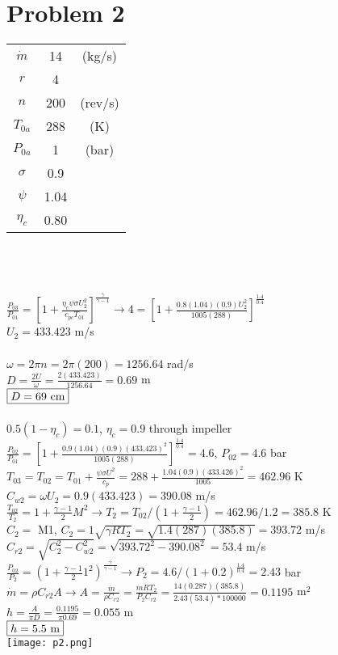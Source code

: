 \documentclass{article}
\begin{document}
\section*{Problem 2}
\begin{tabular}{ccc}
    $\dot{m}$ & 14 & (kg/s) \\
    $r$ & 4 \\
    $n$ & 200 & (rev/s) \\
    $T_{0a}$ & 288 & (K) \\
    $P_{0a}$ & 1 & (bar) \\
    $\sigma$ & 0.9 \\
    $\psi$ & 1.04 \\
    $\eta_c$ & 0.80
\end{tabular} \\\\\\
$\frac{P_{03}}{P_{01}}=[1 + \frac{\eta_c \psi \sigma U_2^2}{c_{pc} T_{01}}]^
\frac{\gamma}{\gamma-1} \rightarrow
4 = [1 + \frac{0.8(1.04)(0.9)U_2^2}{1005(288)}]^\frac{1.4}{0.4}$ \\
$U_2=433.423$ m/s \\\\
$\omega=2\pi n=2\pi(200)=1256.64$ rad/s \\
$D=\frac{2U}{\omega}=\frac{2(433.423)}{1256.64}=0.69$ m \\
$\fbox{$D=69$ cm}$ \\\\
$0.5(1-\eta_c)=0.1$, \quad $\eta_c=0.9$ through impeller \\
$\frac{P_{02}}{P_{01}}=[1+\frac{0.9(1.04)(0.9)(433.423)^2}{1005(288)}]^\frac{1.4}{0.4}
=4.6$, \quad $P_{02}=4.6$ bar \\
$T_{03}=T_{02}=T_{01}+\frac{\psi \sigma U^2}{c_p}=288+\frac{1.04(0.9)(433.426)^2}{1005}
=462.96$ K \\
$C_{w2}=\omega U_2=0.9(433.423)=390.08$ m/s \\
$\frac{T_{02}}{T_2}=1+\frac{\gamma-1}{2}M^2 \rightarrow
T_2=T_{02}/(1+\frac{\gamma-1}{2})=462.96/1.2=385.8$ K \\
$C_2=$ M1, \quad $C_2=1\sqrt{\gamma R T_2}=\sqrt{1.4(287)(385.8)}=393.72$ m/s \\
$C_{r2}=\sqrt{C_2^2 - C_{w2}^2}=\sqrt{393.72^2 - 390.08^2}=53.4$ m/s \\
$\frac{P_{02}}{P_2}=(1+\frac{\gamma-1}{2}1^2)^\frac{\gamma}{\gamma-1} \rightarrow
P_2=4.6/(1+0.2)^\frac{1.4}{0.4}=2.43$ bar \\
$\dot{m}=\rho C_{r2} A \rightarrow A=\frac{\dot{m}}{\rho C_{r2}}=
\frac{\dot{m}RT_2}{P_2 C_{r2}}=\frac{14(0.287)(385.8)}{2.43(53.4)*100000}=0.1195$ m$^2$ \\
$h=\frac{A}{\pi D}=\frac{0.1195}{\pi 0.69}=0.055$ m \\
$\fbox{$h=5.5$ m}$ \\
\texttt{[image: p2.png]}
\end{document}

